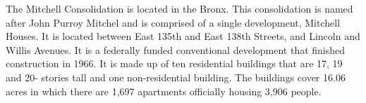 The Mitchell Consolidation is located in the Bronx. This consolidation is named after John Purroy Mitchel and is comprised of a single development, Mitchell Houses. It is located between East 135th and East 138th Streets, and Lincoln and Willis Avenues. It is a federally funded conventional development that finished construction in 1966. It is made up of ten residential buildings that are 17, 19 and 20- stories tall and one non-residential building. The buildings cover 16.06 acres in which there are 1,697 apartments officially housing 3,906 people.